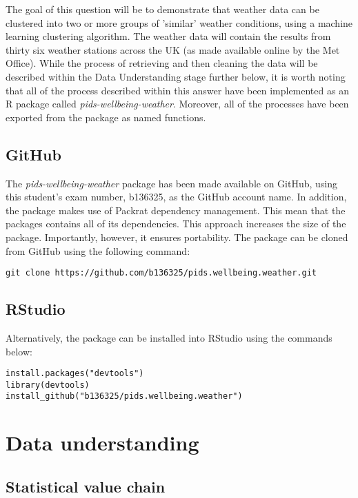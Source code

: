 \documentclass[12pt, oneside, openany]{book}
\begin{document}
The goal of this question will be to demonstrate that weather data can be clustered into two or more groups of 'similar' weather conditions, using a machine learning clustering algorithm. The weather data will contain the results from thirty six weather stations across the UK (as made available online by the Met Office). While the process of retrieving and then cleaning the data will be described within the Data Understanding stage further below, it is worth noting that all of the process described within this answer have been implemented as an R package called \emph{pids-wellbeing-weather}. Moreover, all of the processes have been exported from the package as named functions.

\subsection*{GitHub}
The \emph{pids-wellbeing-weather} package has been made available on GitHub, using this student's exam number, b136325, as the GitHub account name. In addition, the package makes use of Packrat dependency management. This mean that the packages contains all of its dependencies. This approach increases the size of the package. Importantly, however, it ensures portability. The package can be cloned from GitHub using the following command: 


\begin{verbatim}
git clone https://github.com/b136325/pids.wellbeing.weather.git
\end{verbatim}

\subsection*{RStudio}
Alternatively, the package can be installed into RStudio using the commands below: 

\begin{verbatim}
install.packages("devtools")
library(devtools)
install_github("b136325/pids.wellbeing.weather")
\end{verbatim}

\section*{Data understanding}

\subsection*{Statistical value chain}
\end{document}
